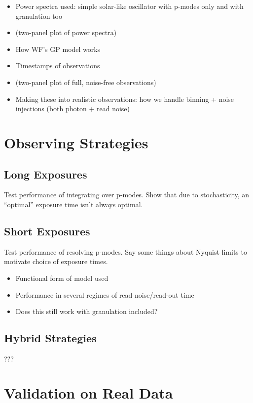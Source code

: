 \documentclass[modern]{aastex62}
\begin{document}
\begin{itemize}
\item Power spectra used: simple solar-like oscillator with p-modes only and with granulation too
\item (two-panel plot of power spectra)
\item How WF's GP model works
\item Timestamps of observations
\item (two-panel plot of full, noise-free observations)
\item Making these into realistic observations: how we handle binning + noise injections (both photon + read noise)
\end{itemize}

\section{Observing Strategies}

\subsection{Long Exposures}

Test performance of integrating over p-modes. Show that due to stochasticity, an ``optimal'' exposure time isn't always optimal.

\subsection{Short Exposures}

Test performance of resolving p-modes. Say some things about Nyquist limits to motivate choice of exposure times.

\begin{itemize}
\item Functional form of model used
\item Performance in several regimes of read noise/read-out time
\item Does this still work with granulation included?
\end{itemize}

\subsection{Hybrid Strategies}

???

\section{Validation on Real Data}
\end{document}
